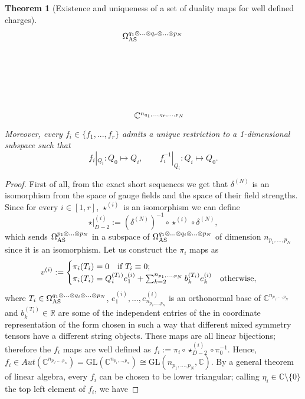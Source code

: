 \documentclass[a4paper,12pt]{article}
\newtheorem{Theorem}{Theorem}[section]
\begin{document}
\begin{Theorem}[Existence and uniqueness of a set of duality maps for well defined charges]
\begin{equation}
\begin{tikzpicture}[x=0.62pt,y=0.75pt,yscale=-1,xscale=1]
\draw (544.33,272.17) node [anchor=north west][inner sep=0.75pt]  [rotate=-0.36]  {$\Omega _{\textnormal{AS}}^{q_{1} \otimes ...\otimes q_{r} \otimes ...\otimes p_{N}}$};
\draw (567.55,403.4) node [anchor=north west][inner sep=0.75pt]    {$\mathbb{C}^{n_{q_{1} ,...,q_{r} ,...,p_{N}}}$};
\end{tikzpicture}
\end{equation}
Moreover, every $f_i \in \{f_1,...,f_r\}$ admits a unique restriction to a 1-dimensional subspace such that 
\begin{equation}
    f_i|_{Q_i}: Q_0 \mapsto Q_i, \qquad f_i^{-1}|_{Q_i}: Q_i \mapsto Q_0. 
\end{equation}    
\end{Theorem}
\begin{proof}
    First of all, from the exact short sequences we get that $\delta^{(N)}$ is an isomorphism from the space of gauge fields and the space of their field strengths. Since for every $i \in [1,r]$, $\star^{(i)}$ is an isomorphism we can define 
    \begin{equation}
        \star|_{D-2}^{(i)}:=(\delta^{(N)})^{-1} \circ \star^{(i)} \circ \delta^{(N)},
    \end{equation}
which sends $\Omega _{\textnormal{AS}}^{p_{1} \otimes ...\otimes p_{N}}$ in a subspace of $\Omega _{\textnormal{AS}}^{q_{1}\otimes ...\otimes q_{i}\otimes ...\otimes p_{N}}$ of dimension $n_{p_1,...,p_N}$ since it is an isomorphism. Let us construct the $\pi_i$ maps as 
\begin{equation}
    v^{(i)}:=\begin{cases}
        \pi_i(T_i)=0 \ \ \ \textnormal{if} \  T_i\equiv 0;\\
        \pi_i(T_i)=Q^{(T_i)}_{i}e^{(i)}_1+\sum_{k=2}^{n_{p_1,...,p_N}} b^{(T_i)}_ke^{(i)}_k \ \ \ \textnormal{otherwise},
    \end{cases}
\end{equation}
where $T_i \in \Omega _{\textnormal{AS}}^{q_{1}\otimes ...\otimes q_{i}\otimes ...\otimes p_{N}}$, $e^{(i)}_1,...,e^{(i)}_{n_{p_1,...,p_N}}$ is an orthonormal base of $\mathbb{C}^{n_{p_1,...,p_N}}$ and $b^{(T_i)}_k\in \mathbb{R}$ are some of the independent entries of the in coordinate representation of the form chosen in such a way that different mixed symmetry tensors have a different string objects. These maps are all linear bijections; therefore the $f_i$ maps are well defined as $f_i:=\pi_i \circ \star^{(i)}_{D-2} \circ \pi_0^{-1}$. Hence, $f_i \in Aut(\mathbb{C}^{n_{p_1,...,p_N}})=\mathrm{GL}(\mathbb{C}^{n_{p_1,...,p_N}}) \cong \mathrm{GL}(n_{p_1,...,p_N},\mathbb{C})$. By a general theorem of linear algebra, every $f_i$ can be chosen to be lower triangular; calling $\eta_i \in \mathbb{C} \setminus \{0\}$ the top left element of $f_i$, we have

\end{proof}
\end{document}
